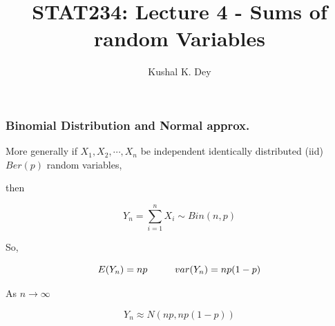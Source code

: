 \documentclass{beamer}\usepackage[]{graphicx}\usepackage[]{color}
\title{STAT234: Lecture 4 - Sums of random Variables}
\author{Kushal K. Dey}
\date{}
\begin{document}





\begin{frame}{}
\maketitle
\end{frame}


\begin{frame}[fragile]
\frametitle{Binomial Distribution and Normal approx.}

More generally if $X_1, X_2, \cdots, X_n$ be independent identically distributed (iid) $Ber(p)$ random variables, 

then 

$$ Y_{n} = \sum_{i=1}^{n} X_{i} \sim Bin \left ( n, p \right) $$

So, 

$$ E(Y_{n}) = np  \hspace{1 cm} var(Y_{n}) = np (1-p) $$

As $n \rightarrow \infty$

$$ Y_{n} \approx N \left ( np, np(1-p) \right)  $$

\end{frame}
\end{document}
